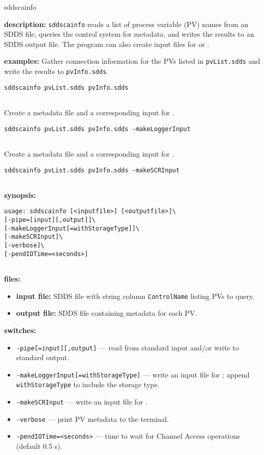 %
%
\begin{sddsprog}{sddscainfo}
\item \textbf{description:}
  \verb+sddscainfo+ reads a list of process variable (PV) names from an SDDS file,
  queries the control system for metadata, and writes the results to an SDDS output file.
  The program can also create input files for  or .

\item \textbf{examples:}
  Gather connection information for the PVs listed in \verb+pvList.sdds+ and write the results to \verb+pvInfo.sdds+.
  \begin{verbatim}
sddscainfo pvList.sdds pvInfo.sdds
  
\end{verbatim}
  Create a metadata file and a corresponding input for .
  \begin{verbatim}
sddscainfo pvList.sdds pvInfo.sdds -makeLoggerInput
  
\end{verbatim}
  Create a metadata file and a corresponding input for .
  \begin{verbatim}
sddscainfo pvList.sdds pvInfo.sdds -makeSCRInput
  
\end{verbatim}

\item \textbf{synopsis:}
  \begin{verbatim}
usage: sddscainfo [<inputfile>] [<outputfile>]\
[-pipe=[input][,output]]\
[-makeLoggerInput[=withStorageType]]\
[-makeSCRInput]\
[-verbose]\
[-pendIOTime=<seconds>]
  
\end{verbatim}

\item \textbf{files:}
\begin{itemize}
  \item \textbf{input file:} SDDS file with string column \verb|ControlName| listing PVs to query.
  \item \textbf{output file:} SDDS file containing metadata for each PV.
\end{itemize}

\item \textbf{switches:}
\begin{itemize}
  \item {\tt -pipe[=input][,output]} --- read from standard input and/or write to standard output.
  \item {\tt -makeLoggerInput[=withStorageType]} --- write an input file for ; append \verb|withStorageType| to include the storage type.
  \item {\tt -makeSCRInput} --- write an input file for .
  \item {\tt -verbose} --- print PV metadata to the terminal.
  \item {\tt -pendIOTime=<seconds>} --- time to wait for Channel Access operations (default 0.5 s).
\end{itemize}


\end{sddsprog}
